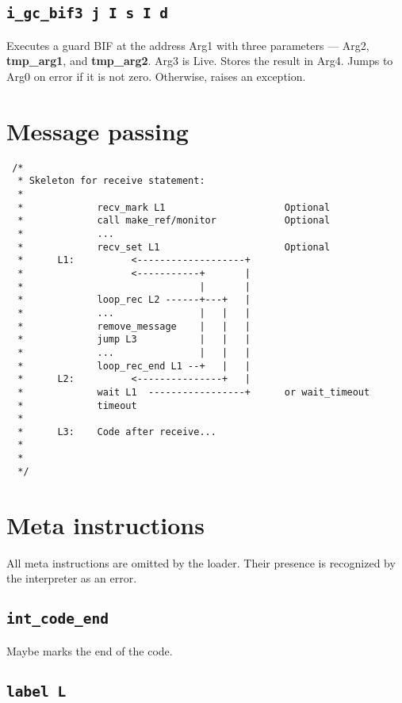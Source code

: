\documentclass{article}
\newcommand{\tmpa}{\textbf{tmp\_arg1}}
\newcommand{\tmpb}{\textbf{tmp\_arg2}}
\newcommand{\iop}[1]{\texttt{#1}}
\begin{document}
\subsection*{\iop{i\_gc\_bif3 j I s I d}}

Executes a guard BIF at the address Arg1 with three parameters --- Arg2,
\tmpa{}, and \tmpb{}. Arg3 is Live. Stores the result in Arg4. Jumps to Arg0 on
error if it is not zero.  Otherwise, raises an exception.

\section*{Message passing}

\begin{verbatim}
 /*
  * Skeleton for receive statement:
  *
  *             recv_mark L1                     Optional
  *             call make_ref/monitor            Optional
  *             ...
  *             recv_set L1                      Optional
  *      L1:          <-------------------+
  *                   <-----------+       |
  *                               |       |
  *             loop_rec L2 ------+---+   |
  *             ...               |   |   |
  *             remove_message    |   |   |
  *             jump L3           |   |   |
  *             ...               |   |   |
  *             loop_rec_end L1 --+   |   |
  *      L2:          <---------------+   |
  *             wait L1  -----------------+      or wait_timeout
  *             timeout
  *
  *      L3:    Code after receive...
  *
  *
  */
\end{verbatim}

\section*{Meta instructions}

All meta instructions are omitted by the loader. Their presence is recognized by
the interpreter as an error.

\subsection*{\iop{int\_code\_end}}

Maybe marks the end of the code.

\subsection*{\iop{label L}}
\end{document}
